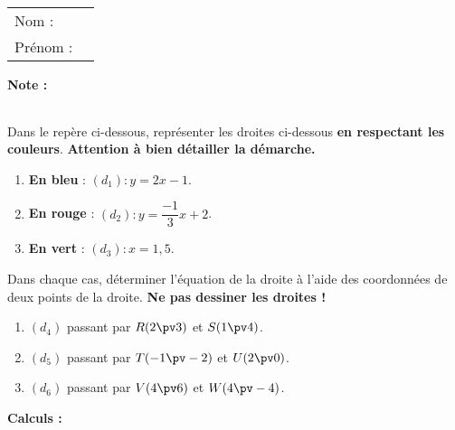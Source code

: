\documentclass[10pt,french]{book}
\newcommand\presentation{
\setcounter{exo}{0}
    \begin{tabular}{ll}
        Nom : \\[5pt]
        Prénom :
    \end{tabular}
\hfill
    \textbf{Note :}
        \renewcommand\arraystretch{2.3}
    \begin{tabular}{|c|}
        \hline
            \slashbox{\Huge\bfseries\phantom{10}}{\Huge\bfseries 10}\\
        \hline
    \end{tabular}
        \renewcommand\arraystretch{1.5}\par
    \vspace{1cm}
    \hrulefill
}
\begin{document}
\begin{landscape}
\presentation

\begin{multicols}{2}

\exo Dans le repère \OIJ ci-dessous, représenter les droites ci-dessous \textbf{en respectant les couleurs}. \textbf{Attention à bien détailler la démarche.}
\begin{enumerate}
    \item \textbf{En bleu} : $(d_1) : y = 2x - 1$.
    \item \textbf{En rouge} : $(d_2) : y = \dfrac{-1}{3} x + 2$.
    \item \textbf{En vert} : $(d_3) : x = 1,5$.
\end{enumerate}\medskip

\exo Dans chaque cas, déterminer l'équation de la droite à l'aide des coordonnées de deux points de la droite. \textbf{Ne pas dessiner les droites !}
\begin{enumerate}
    \item $(d_4)$ passant par $R(2 \pv 3)$ et $S(1 \pv 4)$.
    \item $(d_5)$ passant par $T(-1 \pv -2)$ et $U(2 \pv 0)$.
    \item $(d_6)$ passant par $V(4\pv 6)$ et $W(4 \pv -4)$.
\end{enumerate}

\begin{center}
\end{center}

\columnbreak

\textbf{Calculs :}

\end{multicols}



\end{landscape}
\end{document}
